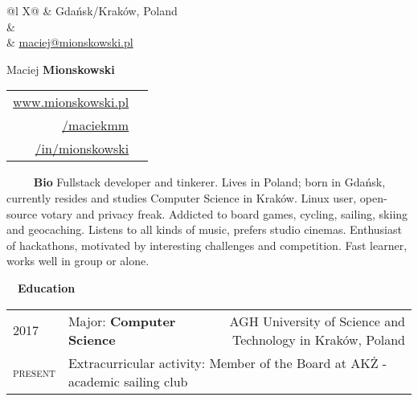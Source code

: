 \documentclass[a4paper, 11pt]{article}
\newcommand{\sectitle}[2]{\large{#1} \ \ \Large{\textbf{#2}}}
\begin{document}
	\pagestyle{fancy}

	\begin{center}
	\begin{multicols}{3}
		\begin{tabularx}{\linewidth}{@{}l X@{}}
			\faMapMarker & Gdańsk/Kraków, Poland \\
			\IfFileExists{confidential.tex}{\faPhone & \href{tel:\phoneNumber}{\prettyPhoneNumber} \\}{}
			\faEnvelope	 & \href{mailto:maciej@mionskowski.pl}{maciej@mionskowski.pl} \\
		\end{tabularx} \vfill \null

		\columnbreak
			{\Huge{Maciej \textbf{Mionskowski}}}
		\columnbreak

		\begin{tabularx}{\linewidth}{R | r}
				\href{https://www.mionskowski.pl}{www.mionskowski.pl} & \faLink \\
				\href{https://www.github.com/maciekmm}{/maciekmm} & \faGithub \\
				\href{https://www.linkedin.com/in/mionskowski}{/in/mionskowski} & \faLinkedin \\
		\end{tabularx} \vfill \null
	\end{multicols}
	\end{center}

	\begin{section}{\sectitle{\ \faUser}{\ Bio}}
		Fullstack developer and tinkerer. Lives in Poland; born in Gdańsk, currently resides and studies Computer Science in Kraków. Linux user, open-source votary and privacy freak. Addicted to board games, cycling, sailing, skiing and geocaching. Listens to all kinds of music, prefers studio cinemas. Enthusiast of hackathons, motivated by interesting challenges and competition. Fast learner, works well in group or alone.
	\end{section}

	\newcommand{\education}[6]{
		\textsc{#1} & #3: \textbf{#4} & \small{#5} \\[-0.5ex]
		\textsc{#2} & \multicolumn{2}{l}{\footnotesize Extracurricular activity: #6}\\
	}

	\begin{section}{\sectitle{\faGraduationCap}{Education}}
		\begin{tabularx}{\linewidth}{@{}p{1.4cm} | X  r}
			\education{2017}{present}{Major}{Computer Science}{AGH University of Science and Technology in Kraków, Poland}{Member of the Board at AKŻ - academic sailing club }
		\end{tabularx}
	\end{section}
\end{document}
